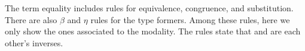 \begin{AgdaAlign}
The term equality includes rules for equivalence, congruence, and
substitution. There are also $\beta$ and $\eta$ rules for the type
formers. Among these rules, here we only show the ones associated to the
 modality. The rules state that  and  are each
other's inverses.
\end{AgdaAlign}
